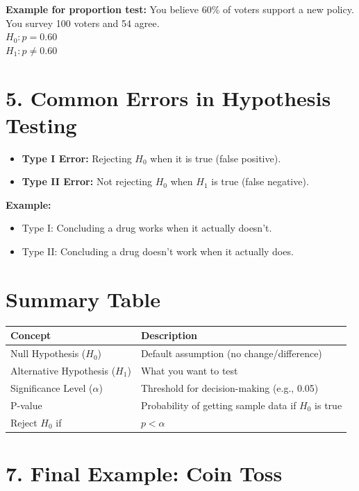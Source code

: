 \documentclass[twoside]{book}
\begin{document}
\textbf{Example for proportion test:} You believe 60\% of voters support a new policy. You survey 100 voters and 54 agree. \\
\( H_0: p = 0.60 \) \\
\( H_1: p \neq 0.60 \)

\section*{5. Common Errors in Hypothesis Testing}

\begin{itemize}
    \item \textbf{Type I Error:} Rejecting \( H_0 \) when it is true (false positive).
    \item \textbf{Type II Error:} Not rejecting \( H_0 \) when \( H_1 \) is true (false negative).
\end{itemize}

\textbf{Example:}
\begin{itemize}
    \item Type I: Concluding a drug works when it actually doesn’t.
    \item Type II: Concluding a drug doesn’t work when it actually does.
\end{itemize}

\section{Summary Table}

\begin{center}
\begin{tabular}{ll}
\toprule
\textbf{Concept} & \textbf{Description} \\
\midrule
Null Hypothesis (\( H_0 \)) & Default assumption (no change/difference) \\
Alternative Hypothesis (\( H_1 \)) & What you want to test \\
Significance Level (\( \alpha \)) & Threshold for decision-making (e.g., 0.05) \\
P-value & Probability of getting sample data if \( H_0 \) is true \\
Reject \( H_0 \) if & \( p < \alpha \) \\
\bottomrule
\end{tabular}
\end{center}

\section*{7. Final Example: Coin Toss}
\end{document}
